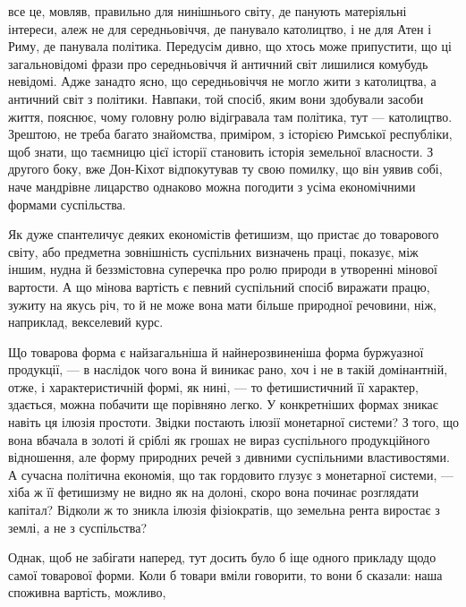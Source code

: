 {все це, мовляв, правильно для нинішнього світу, де панують матеріяльні
інтереси, алеж не для середньовіччя, де панувало католицтво, і не для
Атен і Риму, де панувала політика. Передусім дивно, що хтось може
припустити, що ці загальновідомі фрази про середньовіччя й античний
світ лишилися комубудь невідомі. Адже занадто ясно, що середньовіччя
не могло жити з католицтва, а античний світ з політики. Навпаки, той
спосіб, яким вони здобували засоби життя, пояснює, чому головну ролю
відігравала там політика, тут — католицтво. Зрештою, не треба багато
знайомства, приміром, з історією Римської республіки, щоб знати, що
таємницю цієї історії становить історія земельної власности. З другого
боку, вже Дон-Кіхот відпокутував ту свою помилку, що він уявив собі,
наче мандрівне лицарство однаково можна погодити з усіма економічними
формами суспільства.
}

Як дуже спантеличує деяких економістів фетишизм, що пристає
до товарового світу, або предметна зовнішність суспільних
визначень праці, показує, між іншим, нудна й беззмістовна суперечка
про ролю природи в утворенні мінової вартости. А що
мінова вартість є певний суспільний спосіб виражати працю,
зужиту на якусь річ, то й не може вона мати більше природної
речовини, ніж, наприклад, векселевий курс.

Що товарова форма є найзагальніша й найнерозвиненіша
форма буржуазної продукції, — в наслідок чого вона й виникає
рано, хоч і не в такій домінантній, отже, і характеристичній
формі, як нині, — то фетишистичний її характер, здається, можна
побачити ще порівняно легко. У конкретніших формах зникає
навіть ця ілюзія простоти. Звідки постають ілюзії монетарної
системи? З того, що вона вбачала в золоті й сріблі як грошах не
вираз суспільного продукційного відношення, але форму природних
речей з дивними суспільними властивостями. А сучасна політична
економія, що так гордовито глузує з монетарної системи, —
хіба ж її фетишизму не видно як на долоні, скоро вона починає
розглядати капітал? Відколи ж то зникла ілюзія фізіократів,
що земельна рента виростає з землі, а не з суспільства?

Однак, щоб не забігати наперед, тут досить було б іще одного
прикладу щодо самої товарової форми. Коли б товари вміли говорити,
то вони б сказали: наша споживна вартість, можливо,
\parbreak{}  %
